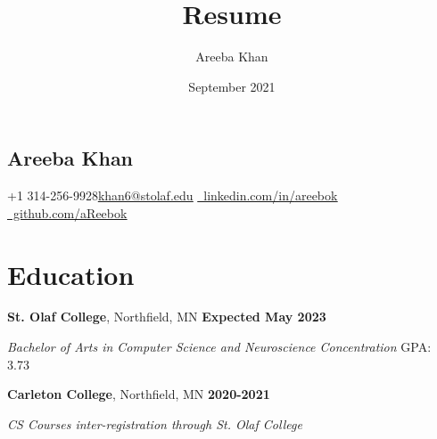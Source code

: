 \documentclass[12pt, letterpaper]{article}
\title{Resume}
\author{Areeba Khan}
\date{September 2021}
\begin{document}
%
%
\begin{center}
    \section*{\LARGE{Areeba Khan}}\vspace{-0.75em}
    \small +1 314-256-9928\qquad \href{mailto:khan6@stolaf.edu}{\underline{khan6@stolaf.edu}} \qquad \href{https://linkedin.com/in/areebok}{\raisebox{-0.2\height}\ linkedin.com/in/\underline{areebok}}   \qquad \href{https://github.com/aReebok}{\raisebox{-0.2\height}\ github.com/\underline{aReebok}}
    \vspace{-1em}
\end{center}
%
%

\section*{\large\textbf{Education}}\vspace{-0.5em}\hline\vspace{0.5em}
\small \textbf{St. Olaf College}, Northfield, MN \hfill \small\textbf{Expected May 2023}

\textit{Bachelor of Arts in Computer Science and Neuroscience Concentration} \hfill \small GPA: 3.73
\vspace{0.35em}

\noindent
\small \textbf{Carleton College}, Northfield, MN \hfill \textbf{\small2020-2021}

\textit{CS Courses inter-registration through St. Olaf College}
\vspace{-1em}
\end{document}
